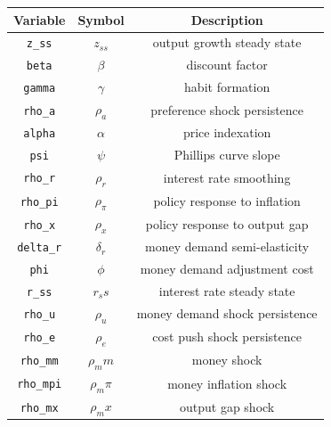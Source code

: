 \documentclass[11pt,preprint, authoryear]{elsarticle}
\let\origtable\table
\let\endorigtable\endtable
\renewenvironment{table}[1][2] {
    \expandafter\origtable\expandafter[H]
} {
    \endorigtable
}
\numberwithin{equation}{section}
\numberwithin{figure}{section}
\numberwithin{table}{section}
\begin{document}
\begin{table}
\caption{Parameters}
 \label{Table:para}
 \begin{center}
\begin{tabular}{|c|c|c|} 
\hline
  Variable & Symbol & Description \\ 
\hline
\texttt{z\_ss} & ${z_{ss}}$ & output growth steady state\\
\texttt{beta} & ${\beta}$ & discount factor\\
\texttt{gamma} & ${\gamma}$ & habit formation\\
\texttt{rho\_a} & ${\rho_a}$ & preference shock persistence\\
\texttt{alpha} & ${\alpha}$ & price indexation\\
\texttt{psi} & ${\psi}$ & Phillips curve slope\\
\texttt{rho\_r} & ${\rho_r}$ & interest rate smoothing\\
\texttt{rho\_pi} & ${\rho_\pi}$ & policy response to inflation\\
\texttt{rho\_x} & ${\rho_x}$ & policy response to output gap\\
\texttt{delta\_r} & ${\delta_r}$ & money demand semi-elasticity \\
\texttt{phi} & ${\phi}$ & money demand adjustment cost\\
\texttt{r\_ss} & ${r_ss}$ & interest rate steady state\\
\texttt{rho\_u} & ${\rho_u}$ & money demand shock persistence\\
\texttt{rho\_e} & ${\rho_e}$ & cost push shock persistence\\
\texttt{rho\_mm} & ${\rho_mm}$ & money shock\\
\texttt{rho\_mpi} & ${\rho_m\pi}$ & money inflation shock\\
\texttt{rho\_mx} & ${\rho_mx}$ & output gap shock\\
\hline
\end{tabular}
\end{center}
\end{table}


\end{document}
